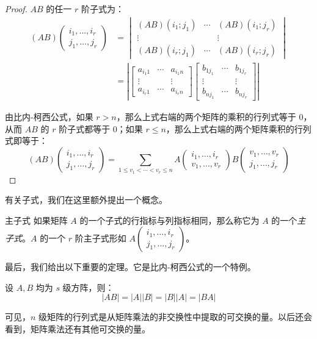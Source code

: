 \begin{proof}
	$AB$ 的任一 $r$ 阶子式为：
	$$
	\begin{aligned}
		(AB) \begin{pmatrix} i_1, \ldots, i_r \\ j_1, \ldots, j_r \end{pmatrix} &=
		\begin{vmatrix}
			(AB)(i_1; j_1) & \cdots & (AB)(i_1; j_r)
			\\
			\vdots & & \vdots
			\\
			(AB)(i_r; j_1) & \cdots & (AB)(i_r; j_r)
		\end{vmatrix}
		\\&=
		\left|
		\begin{bmatrix}
			a_{i_1 1} & \cdots & a_{i_1 n}
			\\
			\vdots & & \vdots
			\\
			a_{i_r 1} & \cdots & a_{i_r n}
		\end{bmatrix}
		\begin{bmatrix}
			b_{1 j_1} & \cdots & b_{1 j_r}
			\\
			\vdots & & \vdots
			\\
			b_{n j_1} & \cdots & b_{n j_r}
		\end{bmatrix}
		\right|
	\end{aligned}
	$$

	由比内-柯西公式，如果 $r > n$，那么上式右端的两个矩阵的乘积的行列式等于 $0$，从而 $AB$ 的 $r$ 阶子式都等于 $0$；如果 $r \le n$，那么上式右端的两个矩阵乘积的行列式即等于：
	$$
	(AB) \begin{pmatrix} i_1, \ldots, i_r \\ j_1, \ldots, j_r \end{pmatrix} = \sum\limits_{1 \le v_1 < \cdots < v_r \le n} A \begin{pmatrix} i_1, \ldots, i_r \\ v_1, \ldots, v_r \end{pmatrix} B \begin{pmatrix} v_1, \ldots, v_r \\ j_1, \ldots, j_r \end{pmatrix}
	$$
\end{proof}

有关子式，我们在这里额外提出一个概念。

\begin{definition}{主子式}
	如果矩阵 $A$ 的一个子式的行指标与列指标相同，那么称它为 $A$ 的一个\emph{主子式}。$A$ 的一个 $r$ 阶主子式形如 $A \begin{pmatrix} i_1, \ldots, i_r \\ j_1, \ldots, j_r \end{pmatrix}$。
\end{definition}

最后，我们给出以下重要的定理。它是比内-柯西公式的一个特例。

\begin{theorem}
	设 $A, B$ 均为 $s$ 级方阵，则：
	$$
	|AB| = |A| |B| = |B| |A| = |BA|
	$$
\end{theorem}

可见，$n$ 级矩阵的行列式是从矩阵乘法的非交换性中提取的可交换的量。以后还会看到，矩阵乘法还有其他可交换的量。